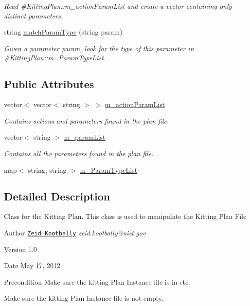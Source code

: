\begin{DoxyCompactItemize}
\begin{DoxyCompactList}\small\item\em Read \#KittingPlan::m\_\-actionParamList and create a vector containing only distinct parameters. \item\end{DoxyCompactList}\item 
string \hyperlink{class_kitting_plan_a380ec5b3dad877c52e274db17e346cda}{matchParamType} (string param)
\begin{DoxyCompactList}\small\item\em Given a parameter {\itshape param\/}, look for the type of this parameter in \#KittingPlan::m\_\-ParamTypeList. \item\end{DoxyCompactList}\end{DoxyCompactItemize}
\subsection*{Public Attributes}
\begin{DoxyCompactItemize}
\item 
vector$<$ vector$<$ string $>$ $>$ \hyperlink{class_kitting_plan_a8293312cf9137906c868994b4ade4587}{m\_\-actionParamList}
\begin{DoxyCompactList}\small\item\em Contains actions and parameters found in the plan file. \item\end{DoxyCompactList}\item 
vector$<$ string $>$ \hyperlink{class_kitting_plan_aa129b8bcc7d7d9660a0eedc18fcff026}{m\_\-paramList}
\begin{DoxyCompactList}\small\item\em Contains all the parameters found in the plan file. \item\end{DoxyCompactList}\item 
map$<$ string, string $>$ \hyperlink{class_kitting_plan_a202e80e92752c93ea614b574c4b1fc00}{m\_\-ParamTypeList}
\end{DoxyCompactItemize}


\subsection{Detailed Description}
Class for the Kitting Plan. This class is used to manipulate the Kitting Plan File \begin{DoxyAuthor}{Author}
\href{http://www.nist.gov/el/isd/ks/kootbally.cfm}{\tt Zeid Kootbally} {\itshape zeid.kootbally@nist.gov\/} 
\end{DoxyAuthor}
\begin{DoxyVersion}{Version}
1.0 
\end{DoxyVersion}
\begin{DoxyDate}{Date}
May 17, 2012 
\end{DoxyDate}
\begin{DoxyPrecond}{Precondition}
Make sure the kitting Plan Instance file is in etc. 

Make sure the kitting Plan Instance file is not empty. 
\end{DoxyPrecond}


